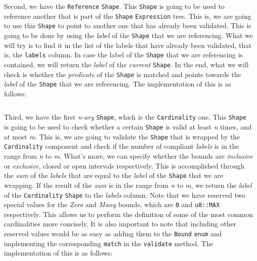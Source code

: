 Second, we have the \texttt{Reference} \texttt{Shape}. This \texttt{Shape} is going to be used to reference another that is part of the \texttt{Shape} \texttt{Expression} tree. This is, we are going to use this \texttt{Shape} to point to another one that has already been validated. This is going to be done by using the \textit{label} of the \texttt{Shape} that we are referencing. What we will try is to find it in the list of the labels that have already been validated, that is, the \texttt{labels} column. In case the {label} of the \texttt{Shape} that we are referencing is contained, we will return the \textit{label} of the \textit{current} \texttt{Shape}. In the end, what we will check is whether the \textit{predicate} of the \texttt{Shape} is matched and points towards the \textit{label} of the \texttt{Shape} that we are referencing. The implementation of this is as follows:

\begin{code}
    \inputminted{rust}{code/listings/11-11_reference.rs}
\end{code}

Third, we have the first \textit{n-ary} \texttt{Shape}, which is the \texttt{Cardinality} one. This \texttt{Shape} is going to be used to check whether a certain \texttt{Shape} is valid at least \textit{n} times, and at most \textit{m}. This is, we are going to validate the \texttt{Shape} that is wrapped by the \texttt{Cardinality} component and check if the number of compliant \textit{labels} is in the range from \textit{n} to \textit{m}. What's more, we can specify whether the bounds are \textit{inclusive} or \textit{exclusive}, closed or open intervals respectively. This is accomplished through the \textit{sum} of the \textit{labels} that are equal to the \textit{label} of the \texttt{Shape} that we are wrapping. If the result of the \textit{sum} is in the range from \textit{n} to \textit{m}, we return the \textit{label} of the \texttt{Cardinality} \texttt{Shape} to the \textit{labels} column. Note that we have reserved two special values for the \textit{Zero} and \textit{Many} bounds, which are \texttt{0} and \texttt{u8::MAX} respectively. This allows us to perform the definition of some of the most common cardinalities more concisely. It is also important to note that including other reserved values would be as easy as adding them to the \texttt{Bound} \texttt{enum} and implementing the corresponding \texttt{match} in the \texttt{validate} method. The implementation of this is as follows:


